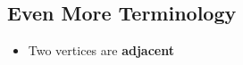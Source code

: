 \subsection{Even More Terminology}

\begin{itemize}
    \item Two vertices are \textbf{adjacent} 
\end{itemize}